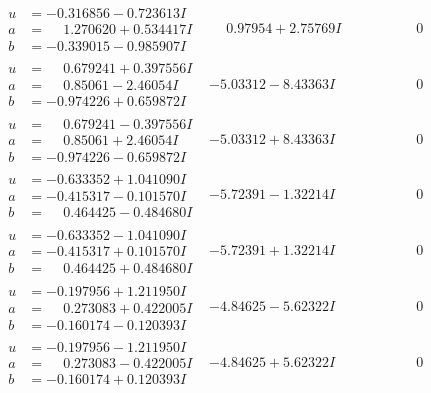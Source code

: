 \documentclass[1p]{elsarticle_modified}
\theoremstyle{definition}
\begin{document}
$$\begin{array}{c|c|c}
\begin{aligned}
u &= -0.316856 - 0.723613 I \\
a &= \phantom{-}1.270620 + 0.534417 I \\
b &= -0.339015 - 0.985907 I\end{aligned}
 & \phantom{-}0.97954 + 2.75769 I & \phantom{-0.000000 } 0 \\ \hline\begin{aligned}
u &= \phantom{-}0.679241 + 0.397556 I \\
a &= \phantom{-}0.85061 - 2.46054 I \\
b &= -0.974226 + 0.659872 I\end{aligned}
 & -5.03312 - 8.43363 I & \phantom{-0.000000 } 0 \\ \hline\begin{aligned}
u &= \phantom{-}0.679241 - 0.397556 I \\
a &= \phantom{-}0.85061 + 2.46054 I \\
b &= -0.974226 - 0.659872 I\end{aligned}
 & -5.03312 + 8.43363 I & \phantom{-0.000000 } 0 \\ \hline\begin{aligned}
u &= -0.633352 + 1.041090 I \\
a &= -0.415317 - 0.101570 I \\
b &= \phantom{-}0.464425 - 0.484680 I\end{aligned}
 & -5.72391 - 1.32214 I & \phantom{-0.000000 } 0 \\ \hline\begin{aligned}
u &= -0.633352 - 1.041090 I \\
a &= -0.415317 + 0.101570 I \\
b &= \phantom{-}0.464425 + 0.484680 I\end{aligned}
 & -5.72391 + 1.32214 I & \phantom{-0.000000 } 0 \\ \hline\begin{aligned}
u &= -0.197956 + 1.211950 I \\
a &= \phantom{-}0.273083 + 0.422005 I \\
b &= -0.160174 - 0.120393 I\end{aligned}
 & -4.84625 - 5.62322 I & \phantom{-0.000000 } 0 \\ \hline\begin{aligned}
u &= -0.197956 - 1.211950 I \\
a &= \phantom{-}0.273083 - 0.422005 I \\
b &= -0.160174 + 0.120393 I\end{aligned}
 & -4.84625 + 5.62322 I & \phantom{-0.000000 } 0 \\ \hline\begin{aligned}

\end{aligned}
\end{array}$$
\end{document}
